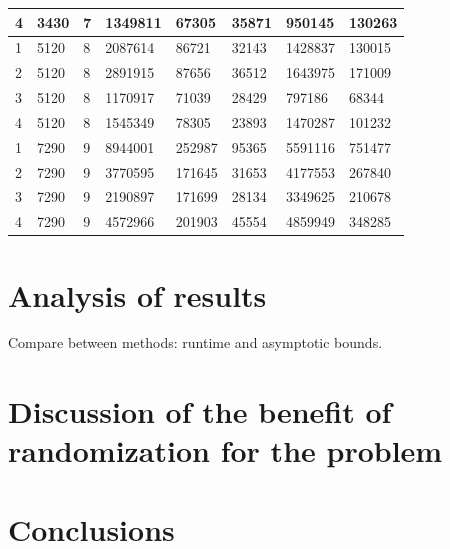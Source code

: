 \documentclass[nocopyrightspace]{acm_proc_article-sp}
\begin{document}
\begin{table}
\begin{tabular}{|l|l|l|l|l|l|l|l|}
4        & 3430 & 7 & 1349811                                                  & 67305        & 35871          & 950145           & 130263             \\ \hline
1        & 5120 & 8 & 2087614                                                  & 86721        & 32143          & 1428837          & 130015             \\ \hline
2        & 5120 & 8 & 2891915                                                  & 87656        & 36512          & 1643975          & 171009             \\ \hline
3        & 5120 & 8 & 1170917                                                  & 71039        & 28429          & 797186           & 68344              \\ \hline
4        & 5120 & 8 & 1545349                                                  & 78305        & 23893          & 1470287          & 101232             \\ \hline
1        & 7290 & 9 & 8944001                                                  & 252987       & 95365          & 5591116          & 751477             \\ \hline
2        & 7290 & 9 & 3770595                                                  & 171645       & 31653          & 4177553          & 267840             \\ \hline
3        & 7290 & 9 & 2190897                                                  & 171699       & 28134          & 3349625          & 210678             \\ \hline
4        & 7290 & 9 & 4572966                                                  & 201903       & 45554          & 4859949          & 348285             \\ \hline
\end{tabular}
\end{table}


\section{Analysis of results}
Compare between methods: runtime and asymptotic bounds.

\section{Discussion of the benefit of randomization for the problem}

\section{Conclusions}



\balancecolumns
\end{document}
